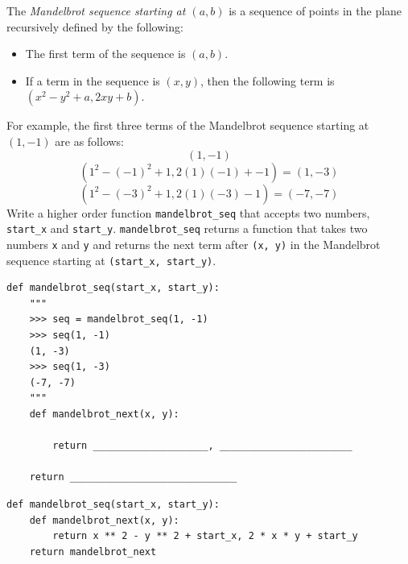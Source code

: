 \begin{blocksection}
\question The \textit{Mandelbrot sequence starting at $(a, b)$} is a sequence of points in the plane recursively defined by the following: 
\begin{itemize}
    \item The first term of the sequence is $(a, b)$.
    \item If a term in the sequence is $(x, y)$, then the following term is $(x^2 - y^2 + a, 2xy + b)$.
\end{itemize}
For example, the first three terms of the Mandelbrot sequence starting at $(1, -1)$ are as follows: 
$$(1, -1)$$ 
$$(1^2 - (-1)^2 + 1, 2(1)(-1) + -1) = (1, -3)$$ 
$$(1^2 - (-3)^2 + 1, 2(1)(-3) - 1) = (-7, -7)$$
Write a higher order function \lstinline{mandelbrot_seq} that accepts two numbers, \lstinline{start_x} and \lstinline{start_y}. \lstinline{mandelbrot_seq} returns a function that takes two numbers \lstinline{x} and \lstinline{y} and returns the next term after \lstinline{(x, y)} in the Mandelbrot sequence starting at \lstinline{(start_x, start_y)}.

\begin{lstlisting}
def mandelbrot_seq(start_x, start_y):
    """ 
    >>> seq = mandelbrot_seq(1, -1)
    >>> seq(1, -1)
    (1, -3)
    >>> seq(1, -3)
    (-7, -7)
    """
    def mandelbrot_next(x, y):

        return ____________________, _______________________

    return _____________________________
\end{lstlisting}

\begin{solution}
\begin{lstlisting}
def mandelbrot_seq(start_x, start_y):
    def mandelbrot_next(x, y):
        return x ** 2 - y ** 2 + start_x, 2 * x * y + start_y
    return mandelbrot_next
\end{lstlisting}
\end{solution}
\end{blocksection}

